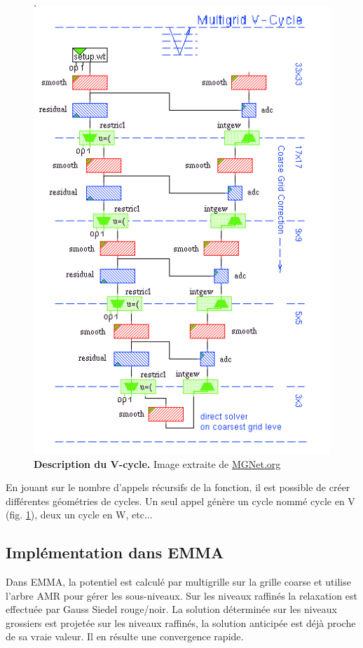 \begin{figure}[htbp]
\begin{center}
\includegraphics[scale=0.35]{img/02/Vcycle.png}
\caption{\textbf{Description du V-cycle.} Image extraite de \href{http://MGNet.org}{MGNet.org}}
\label{Description du V-cycle}
\end{center}
\end{figure}		

En jouant sur le nombre d'appels récursifs de la fonction, il est possible de créer différentes géométries de cycles. 
Un seul appel génère un cycle nommé cycle en V (fig. \ref{Description du V-cycle}), deux un cycle en W, etc... 

\subsection{Implémentation dans EMMA}
Dans EMMA, la potentiel est calculé par multigrille sur la grille coarse et utilise l'arbre \ac{AMR} pour gérer les sous-niveaux.
Sur les niveaux raffinés la relaxation est effectuée par Gauss Siedel rouge/noir.
La solution déterminée sur les niveaux grossiers est projetée sur les niveaux raffinés, la solution anticipée est déjà proche de sa vraie valeur. 
Il en résulte une convergence rapide.

